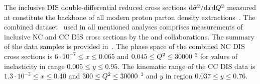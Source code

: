 The inclusive DIS double-differential reduced cross sections $\mathrm{d}\tilde\sigma^2/\mathrm{d}x\mathrm{d}\mbox{${Q^2}$}$ measured at \hera constitute the backbone of all modern proton parton density extractions~\cite{Lai:2010vv,Martin:2009iq,Alekhin:2012ig,Ball:2011uy,Aaron:2009aa}. The combined dataset~\cite{Aaron:2009aa} used in all mentioned analyses comprises measurements of inclusive NC and CC DIS cross sections by the \hone and \zeus collaborations. The summary of the data samples is provided in~\cite{Aaron:2009aa}. The phase space of the combined NC DIS cross sections is $6\cdot 10^{-7} \le x \le 0.065$ and $0.045 \le \mbox{${Q^2}$} \le 30000$ \GeV$^2$ for values of inelasticity in range $0.005 \le y \le 0.95$. The kinematic range of the CC DIS data is $1.3\cdot 10^{-2} \le x \le 0.40$ and $300 \le \mbox{${Q^2}$} \le 30000$ \GeV$^2$ and $y$ in region $0.037 \le y \le 0.76$.

